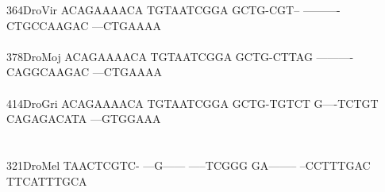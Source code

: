 \documentclass[11pt,twoside,reqno,a4paper]{article}
\begin{document}
{364\hspace*{1\charwidth}DroVir	ACAGAAAACA	TGTAATCGGA	GCTG-CGT--	----------	CTGCCAAGAC	---CTGAAAA	\\
\hspace*{4\charwidth}\hspace*{7\charwidth}\hspace*{1\charwidth}\hspace*{1\charwidth}\hspace*{1\charwidth}\hspace*{1\charwidth}\hspace*{1\charwidth}\hspace*{1\charwidth}\\
378\hspace*{1\charwidth}DroMoj	ACAGAAAACA	TGTAATCGGA	GCTG-CTTAG	----------	CAGGCAAGAC	---CTGAAAA	\\
\hspace*{4\charwidth}\hspace*{7\charwidth}\hspace*{1\charwidth}\hspace*{1\charwidth}\hspace*{1\charwidth}\hspace*{1\charwidth}\hspace*{1\charwidth}\hspace*{1\charwidth}\\
414\hspace*{1\charwidth}DroGri	ACAGAAAACA	TGTAATCGGA	GCTG-TGTCT	G----TCTGT	CAGAGACATA	---GTGGAAA	\\
\hspace*{4\charwidth}\hspace*{7\charwidth}\hspace*{1\charwidth}\hspace*{1\charwidth}\hspace*{1\charwidth}\hspace*{1\charwidth}\hspace*{1\charwidth}\hspace*{1\charwidth}\\
\\
321\hspace*{1\charwidth}DroMel	TAACTCGTC-	---G------	-----TCGGG	GA--------	--CCTTTGAC	TTCATTTGCA	\\
\hspace*{4\charwidth}\hspace*{7\charwidth}\hspace*{1\charwidth}\hspace*{1\charwidth}\hspace*{1\charwidth}\hspace*{1\charwidth}\hspace*{1\charwidth}\hspace*{1\charwidth}\\
}
\end{document}
